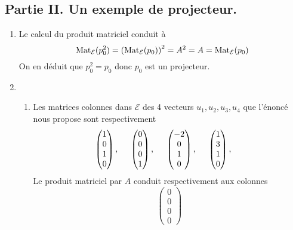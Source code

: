 \subsection*{Partie II. Un exemple de projecteur.}
\begin{enumerate}
  \item Le calcul du produit matriciel conduit à 
\begin{displaymath}
  \operatorname{Mat}_{\mathcal{E}}(p_0^2) = \left( \operatorname{Mat}_{\mathcal{E}}(p_0)\right)^2 = A^2 = A = \operatorname{Mat}_{\mathcal{E}}(p_0) 
\end{displaymath}
On en déduit que $p_0^2 = p_0$ donc $p_0$ est un projecteur.

  \item 
\begin{enumerate}
  \item Les matrices colonnes dans $\mathcal{E}$ des 4 vecteurs $u_1, u_2, u_3, u_4$ que l'énoncé nous propose sont respectivement
\begin{displaymath}
\begin{pmatrix}
  1 \\ 0 \\ 1 \\ 0
\end{pmatrix},\hspace{0.5cm}
\begin{pmatrix}
  0 \\ 0 \\ 0 \\ 1
\end{pmatrix},\hspace{0.5cm}
\begin{pmatrix}
  -2 \\ 0 \\ 1 \\ 0
\end{pmatrix},\hspace{0.5cm}
\begin{pmatrix}
  1 \\ 3 \\ 1 \\ 0
\end{pmatrix},\hspace{0.5cm}  
\end{displaymath}
Le produit matriciel par $A$ conduit respectivement aux colonnes
\begin{displaymath}
\begin{pmatrix}
  0 \\ 0 \\ 0 \\ 0

\end{pmatrix}
\end{displaymath}
\end{enumerate}
\end{enumerate}
